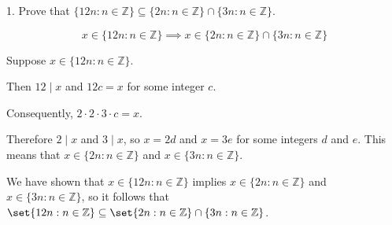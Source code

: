 \documentclass{hippoidC}
\begin{document}
\toc{}

\begin{prooflist}{1. Prove that $\{12 n: n \in \mathbb{Z}\} \subseteq\{2 n: n \in \mathbb{Z}\} \cap\{3 n: n \in \mathbb{Z}\}$.}
	\item

	\[
		x \in \{12 n: n \in \mathbb{Z}\}
		\implies
		x \in \{2 n: n \in \mathbb{Z}\} \cap\{3 n: n \in \mathbb{Z}\}
	\]

	Suppose $x \in \{12 n: n \in \mathbb{Z}\}$.

	Then $12 \mid x$ and $12c=x$ for some integer $c$.

	Consequently, $2\cdot2\cdot3\cdot c =x$.

	Therefore $2\mid x$ and $3\mid x$, so $x =2d$ and $x=3e$ for some integers
	$d$ and $e$.
	This means that $x \in \{2 n: n \in \mathbb{Z}\}$ and $x \in \{3 n: n \in
		\mathbb{Z}\}$.

	We have shown that
	$x \in \{12 n: n \in \mathbb{Z}\}$
	implies
	$x \in\{2n: n \in \mathbb{Z}\}$
	and
	$x \in\{3n: n \in \mathbb{Z}\}$,
	so it follows that
	$\set{12 n: n \in \mathbb{Z}} \subseteq\set{2 n: n \in \mathbb{Z}} \cap\{3 n: n \in
		\mathbb{Z}\}$.
\end{prooflist}
\end{document}

